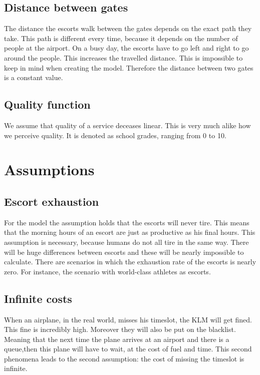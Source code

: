 \documentclass[a4paper, 11pt, notitlepage]{report}
\begin{document}
        \subsection{Distance between gates}
        The distance the escorts walk between the gates depends on the exact path they take. This path is different every time, because it depends on the number of people at the airport. On a busy day, the escorts have to go left and right to go around the people. This increases the travelled distance. This is impossible to keep in mind when creating the model. Therefore the distance between two gates is a constant value.
		
		\subsection{Quality function} We assume that quality of a service deceases linear. This is very much alike how we perceive quality. It is denoted as school grades, ranging from 0 to 10. 

	\section{Assumptions}
		\subsection{Escort exhaustion} For the model the assumption holds that the escorts will never tire. This means that the morning hours of an escort are just as productive as his final hours. This assumption is necessary, because humans do not all tire in the same way. There will be huge differences between escorts and these will be nearly impossible to calculate. There are scenarios in which the exhaustion rate of the escorts is nearly zero. For instance, the scenario with world-class athletes as escorts.
		
		\subsection{Infinite costs} When an airplane, in the real world, misses his timeslot, the KLM will get fined. This fine is incredibly high. Moreover they will also be put on the blacklist. Meaning that the next time the plane arrives at an airport and there is a queue,then this plane will have to wait, at the cost of fuel and time. This second phenomena leads to the second assumption: the cost of missing the timeslot is infinite.
		
\end{document}
